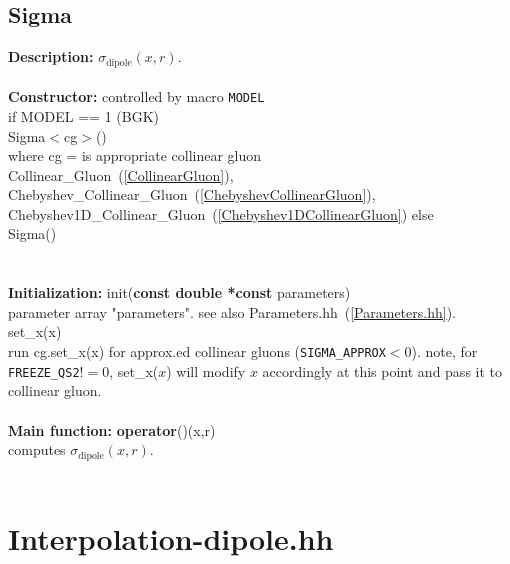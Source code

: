 \documentclass[12pt]{article}
\newenvironment{entry}[1]{\textbf{\large #1:  }}{\\\vspace{3mm}\\}
\begin{document}
\subsection{Sigma}\label{Sigma}
\begin{entry}{Description}
	$\sigma_{\mathrm{dipole}}(x,r)$.
\end{entry}
\begin{entry}{Constructor}
	controlled by macro \texttt{MODEL}\\
	if MODEL == 1 (BGK)\\
		Sigma$<$cg$>$()\\
		where cg = is appropriate collinear gluon\\
		Collinear\_Gluon~(\ref{CollinearGluon}), Chebyshev\_Collinear\_Gluon~(\ref{ChebyshevCollinearGluon}),  Chebyshev1D\_Collinear\_Gluon~(\ref{Chebyshev1DCollinearGluon})
	else \\
		Sigma()\\
\end{entry}
\begin{entry}{Initialization}
	init(\textbf{const double *const }parameters)\\
	parameter array "parameters". see also Parameters.hh~(\ref{Parameters.hh}).\\

	set\_x(x)\\
	run cg.set\_x(x) for approx.ed collinear gluons (\texttt{SIGMA\_APPROX}$<$0).
	note, for \texttt{FREEZE\_QS2}$!=$0, set\_x($x$) will modify $x$ accordingly at this point and pass it to collinear gluon.
\end{entry}
\begin{entry}{Main function}
	\textbf{operator}()(x,r)\\
	computes $\sigma_{\mathrm{dipole}}(x,r)$.
\end{entry}
\section{Interpolation-dipole.hh}\label{Interpolationdipole}
\end{document}
